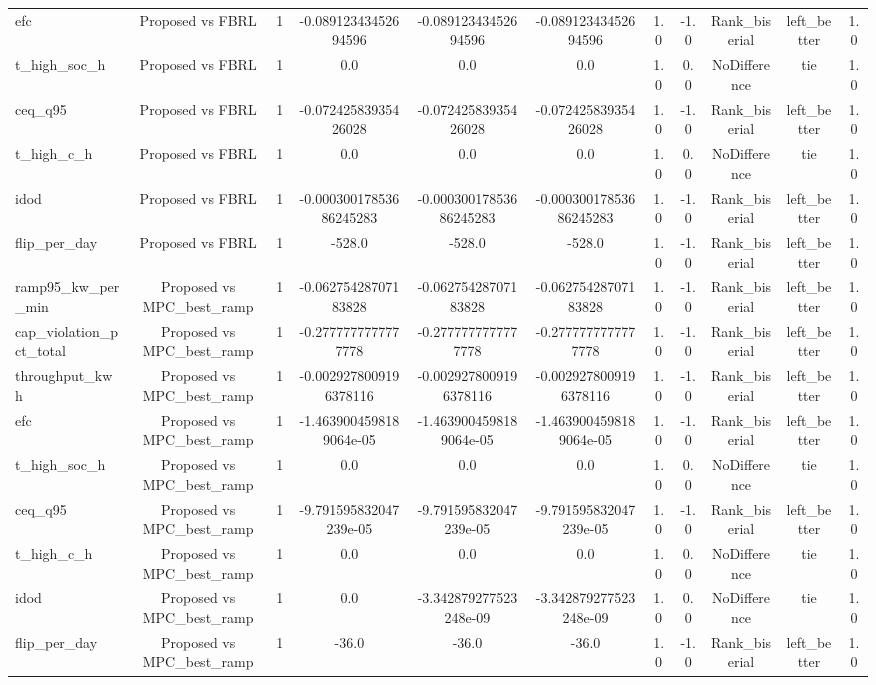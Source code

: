\begin{table}[t]
\begin{tabular}{lcccccccccc}
efc & Proposed vs FBRL & 1 & -0.08912343452694596 & -0.08912343452694596 & -0.08912343452694596 & 1.0 & -1.0 & Rank\_biserial & left\_better & 1.0 \\
t\_high\_soc\_h & Proposed vs FBRL & 1 & 0.0 & 0.0 & 0.0 & 1.0 & 0.0 & NoDifference & tie & 1.0 \\
ceq\_q95 & Proposed vs FBRL & 1 & -0.07242583935426028 & -0.07242583935426028 & -0.07242583935426028 & 1.0 & -1.0 & Rank\_biserial & left\_better & 1.0 \\
t\_high\_c\_h & Proposed vs FBRL & 1 & 0.0 & 0.0 & 0.0 & 1.0 & 0.0 & NoDifference & tie & 1.0 \\
idod & Proposed vs FBRL & 1 & -0.00030017853686245283 & -0.00030017853686245283 & -0.00030017853686245283 & 1.0 & -1.0 & Rank\_biserial & left\_better & 1.0 \\
flip\_per\_day & Proposed vs FBRL & 1 & -528.0 & -528.0 & -528.0 & 1.0 & -1.0 & Rank\_biserial & left\_better & 1.0 \\
ramp95\_kw\_per\_min & Proposed vs MPC\_best\_ramp & 1 & -0.06275428707183828 & -0.06275428707183828 & -0.06275428707183828 & 1.0 & -1.0 & Rank\_biserial & left\_better & 1.0 \\
cap\_violation\_pct\_total & Proposed vs MPC\_best\_ramp & 1 & -0.2777777777777778 & -0.2777777777777778 & -0.2777777777777778 & 1.0 & -1.0 & Rank\_biserial & left\_better & 1.0 \\
throughput\_kwh & Proposed vs MPC\_best\_ramp & 1 & -0.0029278009196378116 & -0.0029278009196378116 & -0.0029278009196378116 & 1.0 & -1.0 & Rank\_biserial & left\_better & 1.0 \\
efc & Proposed vs MPC\_best\_ramp & 1 & -1.4639004598189064e-05 & -1.4639004598189064e-05 & -1.4639004598189064e-05 & 1.0 & -1.0 & Rank\_biserial & left\_better & 1.0 \\
t\_high\_soc\_h & Proposed vs MPC\_best\_ramp & 1 & 0.0 & 0.0 & 0.0 & 1.0 & 0.0 & NoDifference & tie & 1.0 \\
ceq\_q95 & Proposed vs MPC\_best\_ramp & 1 & -9.791595832047239e-05 & -9.791595832047239e-05 & -9.791595832047239e-05 & 1.0 & -1.0 & Rank\_biserial & left\_better & 1.0 \\
t\_high\_c\_h & Proposed vs MPC\_best\_ramp & 1 & 0.0 & 0.0 & 0.0 & 1.0 & 0.0 & NoDifference & tie & 1.0 \\
idod & Proposed vs MPC\_best\_ramp & 1 & 0.0 & -3.342879277523248e-09 & -3.342879277523248e-09 & 1.0 & 0.0 & NoDifference & tie & 1.0 \\
flip\_per\_day & Proposed vs MPC\_best\_ramp & 1 & -36.0 & -36.0 & -36.0 & 1.0 & -1.0 & Rank\_biserial & left\_better & 1.0 \\

\end{tabular}
\end{table}
